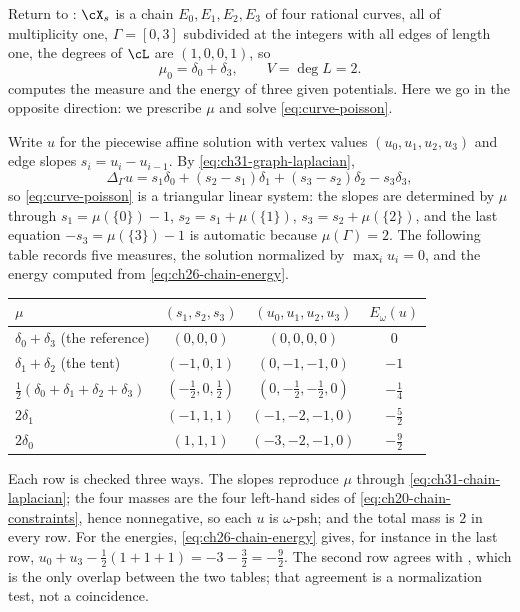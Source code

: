 \begin{example}
\label{ex:ch31-chain-solve}
Return to : $\cX_s$ is a chain
$E_0,E_1,E_2,E_3$ of four rational curves, all of multiplicity one,
$\Gamma=[0,3]$ subdivided at the integers with all edges of length one,
the degrees of $\cL$ are $(1,0,0,1)$, so
\[
 \mu_0=\delta_0+\delta_3,\qquad V=\deg L=2 .
\]
 computes the measure and the energy of three
given potentials.  Here we go in the opposite direction: we prescribe
$\mu$ and solve \eqref{eq:curve-poisson}.

Write $u$ for the piecewise affine solution with vertex values
$(u_0,u_1,u_2,u_3)$ and edge slopes $s_i=u_i-u_{i-1}$.  By
\eqref{eq:ch31-graph-laplacian},
\begin{equation}
\label{eq:ch31-chain-laplacian}
 \Delta_\Gamma u
 =s_1\delta_0+(s_2-s_1)\delta_1+(s_3-s_2)\delta_2-s_3\delta_3 ,
\end{equation}
so \eqref{eq:curve-poisson} is a triangular linear system: the slopes are
determined by $\mu$ through
$s_1=\mu(\{0\})-1$, $s_2=s_1+\mu(\{1\})$, $s_3=s_2+\mu(\{2\})$, and
the last equation $-s_3=\mu(\{3\})-1$ is automatic because
$\mu(\Gamma)=2$.  The following table records five measures, the solution
normalized by $\max_iu_i=0$, and the energy computed from
\eqref{eq:ch26-chain-energy}.
\begin{center}
\small
\begin{tabular}{l|c|c|c}
\toprule
$\mu$&$(s_1,s_2,s_3)$&$(u_0,u_1,u_2,u_3)$&$E_\omega(u)$\\
\midrule
$\delta_0+\delta_3$ (the reference)&$(0,0,0)$&$(0,0,0,0)$&$0$\\
$\delta_1+\delta_2$ (the tent)&$(-1,0,1)$&$(0,-1,-1,0)$&$-1$\\
$\tfrac12(\delta_0+\delta_1+\delta_2+\delta_3)$
 &$(-\tfrac12,0,\tfrac12)$&$(0,-\tfrac12,-\tfrac12,0)$
 &$-\tfrac14$\\
$2\delta_1$&$(-1,1,1)$&$(-1,-2,-1,0)$&$-\tfrac52$\\
$2\delta_0$&$(1,1,1)$&$(-3,-2,-1,0)$&$-\tfrac92$\\
\bottomrule
\end{tabular}
\end{center}
Each row is checked three ways.  The slopes reproduce $\mu$ through
\eqref{eq:ch31-chain-laplacian}; the four masses are the four left-hand
sides of \eqref{eq:ch20-chain-constraints}, hence nonnegative, so each
$u$ is $\omega$-psh; and the total mass is $2$ in every row.  For the
energies, \eqref{eq:ch26-chain-energy} gives, for instance in the last row,
$u_0+u_3-\tfrac12(1+1+1)=-3-\tfrac32=-\tfrac92$.  The second row agrees
with , which is the only overlap between the two
tables; that agreement is a normalization test, not a coincidence.


\end{example}
